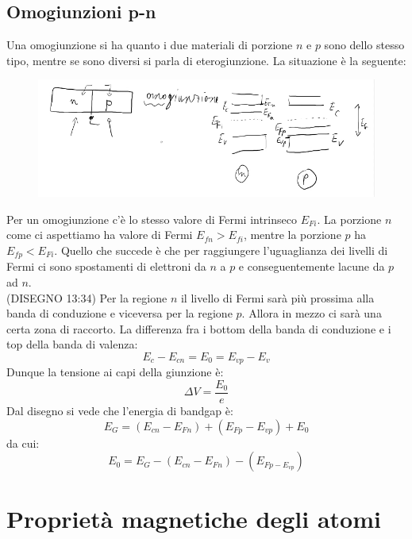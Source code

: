 \documentclass{book}
\begin{document}
    \section{Omogiunzioni p-n}
        Una omogiunzione si ha quanto i due materiali di porzione $n$ e $p$ sono dello stesso tipo, mentre se sono diversi si parla di eterogiunzione. La situazione è la seguente:
        \begin{figure}[h!]
            \centering
            \includegraphics[width=0.75\linewidth]{img/paul.png}
        \end{figure}
        Per un omogiunzione c'è lo stesso valore di Fermi intrinseco $E_{Fi}$. La porzione $n$ come ci aspettiamo ha valore di Fermi $E_{fn} > E_{fi}$, mentre la porzione $p$ ha $E_{fp}<E_{Fi}$.
        Quello che succede è che per raggiungere l'uguaglianza dei livelli di Fermi ci sono spostamenti di elettroni da $n$ a $p$ e conseguentemente lacune da $p$ ad $n$.\\
        (DISEGNO 13:34)
        Per la regione $n$ il livello di Fermi sarà più prossima alla banda di conduzione e viceversa per la regione $p$. Allora in mezzo ci sarà una certa zona di raccorto. La differenza fra i bottom della banda di conduzione e i top della banda di valenza:
        $$E_{c} - E_{cn} = E_{0} = E_{vp} - E_{v}$$
        Dunque la tensione ai capi della giunzione è:
        $$\Delta V = \frac{E_{0}}{e}$$
        Dal disegno si vede che l'energia di bandgap è:
        $$E_{G} = (E_{cn} - E_{Fn})+(E_{Fp}-E_{vp}) + E_{0}$$
        da cui:
        $$E_{0} = E_{G} -(E_{cn}-E_{Fn})-(E_{Fp-E_{vp}})$$

\chapter{Proprietà magnetiche degli atomi}
\end{document}
